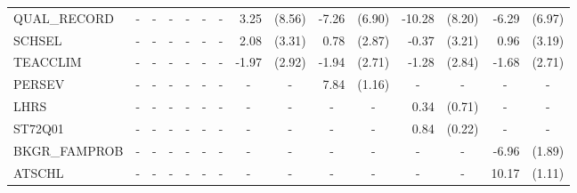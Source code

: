 \documentclass[10pt]{article}
\begin{document}
\begin{table}[htbp]
\begin{tabular}{lrlrlrlrlrlrlrl}
 QUAL\_RECORD & \multicolumn{1}{c}{-} & \multicolumn{1}{c}{-} & \multicolumn{1}{c}{-} & \multicolumn{1}{c}{-} & \multicolumn{1}{c}{-} & \multicolumn{1}{c}{-} & 3.25  & (8.56) & -7.26 & (6.90) & -10.28 & (8.20) & -6.29 & (6.97) \\[0.2em]
 SCHSEL & \multicolumn{1}{c}{-} & \multicolumn{1}{c}{-} & \multicolumn{1}{c}{-} & \multicolumn{1}{c}{-} & \multicolumn{1}{c}{-} & \multicolumn{1}{c}{-} & 2.08  & (3.31) & 0.78  & (2.87) & -0.37 & (3.21) & 0.96  & (3.19) \\[0.2em]
 TEACCLIM & \multicolumn{1}{c}{-} & \multicolumn{1}{c}{-} & \multicolumn{1}{c}{-} & \multicolumn{1}{c}{-} & \multicolumn{1}{c}{-} & \multicolumn{1}{c}{-} & -1.97 & (2.92) & -1.94 & (2.71) & -1.28 & (2.84) & -1.68 & (2.71) \\[0.2em]
 PERSEV & \multicolumn{1}{c}{-} & \multicolumn{1}{c}{-} & \multicolumn{1}{c}{-} & \multicolumn{1}{c}{-} & \multicolumn{1}{c}{-} & \multicolumn{1}{c}{-} & \multicolumn{1}{c}{-} & \multicolumn{1}{c}{-} & 7.84  & (1.16) & \multicolumn{1}{c}{-} & \multicolumn{1}{c}{-} & \multicolumn{1}{c}{-} & \multicolumn{1}{c}{-} \\[0.2em]
 LHRS  & \multicolumn{1}{c}{-} & \multicolumn{1}{c}{-} & \multicolumn{1}{c}{-} & \multicolumn{1}{c}{-} & \multicolumn{1}{c}{-} & \multicolumn{1}{c}{-} & \multicolumn{1}{c}{-} & \multicolumn{1}{c}{-} & \multicolumn{1}{c}{-} & \multicolumn{1}{c}{-} & 0.34  & (0.71) & \multicolumn{1}{c}{-} & \multicolumn{1}{c}{-} \\[0.2em]
 ST72Q01 & \multicolumn{1}{c}{-} & \multicolumn{1}{c}{-} & \multicolumn{1}{c}{-} & \multicolumn{1}{c}{-} & \multicolumn{1}{c}{-} & \multicolumn{1}{c}{-} & \multicolumn{1}{c}{-} & \multicolumn{1}{c}{-} & \multicolumn{1}{c}{-} & \multicolumn{1}{c}{-} & 0.84  & (0.22) & \multicolumn{1}{c}{-} & \multicolumn{1}{c}{-} \\[0.2em]
 BKGR\_FAMPROB & \multicolumn{1}{c}{-} & \multicolumn{1}{c}{-} & \multicolumn{1}{c}{-} & \multicolumn{1}{c}{-} & \multicolumn{1}{c}{-} & \multicolumn{1}{c}{-} & \multicolumn{1}{c}{-} & \multicolumn{1}{c}{-} & \multicolumn{1}{c}{-} & \multicolumn{1}{c}{-} & \multicolumn{1}{c}{-} & \multicolumn{1}{c}{-} & -6.96 & (1.89) \\[0.2em]
 ATSCHL & \multicolumn{1}{c}{-} & \multicolumn{1}{c}{-} & \multicolumn{1}{c}{-} & \multicolumn{1}{c}{-} & \multicolumn{1}{c}{-} & \multicolumn{1}{c}{-} & \multicolumn{1}{c}{-} & \multicolumn{1}{c}{-} & \multicolumn{1}{c}{-} & \multicolumn{1}{c}{-} & \multicolumn{1}{c}{-} & \multicolumn{1}{c}{-} & 10.17 & (1.11) \\[0.2em]

\end{tabular}
\end{table}
\end{document}
